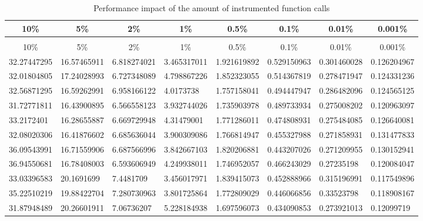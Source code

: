 \begin{landscape}
  \begin{longtable}{llllllll}
    \caption{Performance impact of the amount of instrumented function calls}\\
    \multicolumn{1}{c}{10\%} & \multicolumn{1}{c}{5\%} & \multicolumn{1}{c}{2\%} & \multicolumn{1}{c}{1\%} & \multicolumn{1}{c}{0.5\%} & \multicolumn{1}{c}{0.1\%} & \multicolumn{1}{c}{0.01\%} & \multicolumn{1}{c}{0.001\%} \\\hline
    \endfirsthead
    \caption[]{Performance impact of the amount of instrumented function calls}\\
    \multicolumn{1}{c}{10\%} & \multicolumn{1}{c}{5\%} & \multicolumn{1}{c}{2\%} & \multicolumn{1}{c}{1\%} & \multicolumn{1}{c}{0.5\%} & \multicolumn{1}{c}{0.1\%} & \multicolumn{1}{c}{0.01\%} & \multicolumn{1}{c}{0.001\%} \\\hline
    \endhead
    32.27447295 & 16.57465911 & 6.818274021 & 3.465317011 & 1.921619892 & 0.529150963 & 0.301460028 & 0.126204967 \\
    32.01804805 & 17.24028993 & 6.727348089 & 4.798867226 & 1.852323055 & 0.514367819 & 0.278471947 & 0.124331236 \\
    32.56871295 & 16.59262991 & 6.958166122 & 4.0173738   & 1.757158041 & 0.494447947 & 0.286482096 & 0.124565125 \\
    31.72771811 & 16.43900895 & 6.566558123 & 3.932744026 & 1.735903978 & 0.489733934 & 0.275008202 & 0.120963097 \\
    33.2172401  & 16.28655887 & 6.669729948 & 4.31479001  & 1.771286011 & 0.474808931 & 0.275484085 & 0.126640081 \\
    32.08020306 & 16.41876602 & 6.685636044 & 3.900309086 & 1.766814947 & 0.455327988 & 0.271858931 & 0.131477833 \\
    36.09543991 & 16.71559906 & 6.687566996 & 3.842667103 & 1.820206881 & 0.443207026 & 0.271209955 & 0.130152941 \\
    36.94550681 & 16.78408003 & 6.593606949 & 4.249938011 & 1.746952057 & 0.466243029 & 0.27235198  & 0.120084047 \\
    33.03396583 & 20.1691699  & 7.4481709   & 3.456017971 & 1.839415073 & 0.452888966 & 0.315196991 & 0.117549896 \\
    35.22510219 & 19.88422704 & 7.280730963 & 3.801725864 & 1.772809029 & 0.446066856 & 0.33523798  & 0.118908167 \\
    31.87948489 & 20.26601911 & 7.06736207  & 5.228184938 & 1.697596073 & 0.434090853 & 0.273921013 & 0.12099719  \\

\end{longtable}
\end{landscape}
